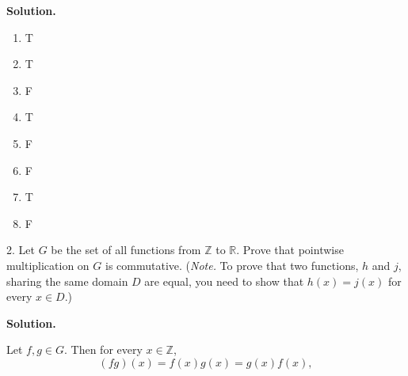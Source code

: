 \documentclass[10pt,]{book}
\theoremstyle{plain}
\theoremstyle{definition}
\theoremstyle{definition}
\theoremstyle{definition}
\theoremstyle{definition}
\numberwithin{equation}{section}
\def\Z{\mathbb{Z}}
\def\R{\mathbb{R}}
\begin{document}
\begin{exerciselist}
\par\smallskip
\par\smallskip
\noindent\textbf{Solution.}\hypertarget{solution-12}{}\quad
\leavevmode%
\begin{multicols}{4}
\begin{enumerate}[label=(\alph*)]
\item\hypertarget{li-103}{}
          T
\item\hypertarget{li-104}{}
          T
\item\hypertarget{li-105}{}
          F
\item\hypertarget{li-106}{}
          T
\item\hypertarget{li-107}{}
          F
\item\hypertarget{li-108}{}
          F
\item\hypertarget{li-109}{}
          T
\item\hypertarget{li-110}{}
          F
\end{enumerate}
\end{multicols}
\item[2.]\hypertarget{exercise-13}{}
        Let \(G\) be the set of all functions from \(\Z\) to \(\R\). Prove that pointwise multiplication on \(G\) is commutative. (\emph{Note.} To prove that two functions, \(h\) and \(j\), sharing the same domain \(D\) are equal, you need to show that \(h(x)=j(x)\) for every \(x\in D\).)
\par\smallskip
\par\smallskip
\noindent\textbf{Solution.}\hypertarget{solution-13}{}\quad

      Let \(f,g\in G\). Then for every \(x\in \Z\),
\begin{equation*}

        (fg)(x)=f(x)g(x)=g(x)f(x),
      
\end{equation*}


\end{exerciselist}
\end{document}
